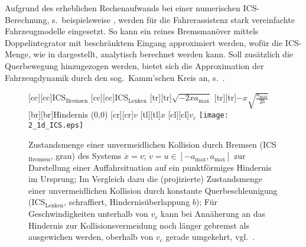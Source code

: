 Aufgrund des erheblichen Rechenaufwands bei einer numerischen ICS-Berechnung, s.\ beispielsweise \cite{Lawitzky2014ICRA, falcone2011predictiveassessment, Karrenberg2008},  %
werden für die Fahrerassistenz stark vereinfachte Fahrzeugmodelle eingesetzt. So kann ein reines Bremsmanöver mittels Doppelintegrator mit beschränktem Eingang approximiert werden, wofür die 
ICS-Menge, wie in  dargestellt, analytisch berechnet werden kann. Soll zusätzlich die Querbewegung hinzugezogen werden, bietet sich die Approximation der Fahrzeugdynamik durch den sog.\ Kamm'schen Kreis \cite{breuer20012bremsenhandbuch} an, s.\ .

	
	







\begin{figure}[h]
\centering
	[cc][cc]{ICS$_\text{Bremsen}$}
	[cc][cc]{ICS$_\text{Lenken}$}
	[tr][tr]{$\sqrt{-2 x a_\text{max}}$}
	[tr][tr]{$-x \sqrt{\frac{a_\text{max}}{2b}}$}
	[br][br]{Hindernis (0,0)}
	[cr][cr]{$v$}
	[tl][tl]{$x$}
	[cl][cl]{$v_c$}
\texttt{[image: 2\_1d\_ICS.eps]}
\caption[Zustandsmenge einer unvermeidlichen Kollision durch Bremsen]{Zustandsmenge einer unvermeidlichen Kollision durch Bremsen (ICS$_\text{Bremsen}$, grau) des Systems $\dot x = v$; $\dot v = u \in [-a_\text{max}, a_\text{max}]$ zur Darstellung einer Auffahrsituation auf ein punktförmiges Hindernis im Ursprung; Im Vergleich dazu die (projizierte) Zustandsmenge einer unvermeidlichen Kollision durch konstante Querbeschleunigung (ICS$_\text{Lenken}$, schraffiert, Hindernisüberlappung $b$); Für Geschwindigkeiten unterhalb von $v_c$ kann bei Annäherung an das Hindernis zur Kollisionsvermeidung noch länger gebremst als ausgewichen werden, oberhalb von $v_c$ gerade umgekehrt, vgl.\ \cite{reinisch2012diss, schmidt2014fahrstrategien}.}
 \label{fig:ausweichen_vs_bremsen}
\end{figure}

